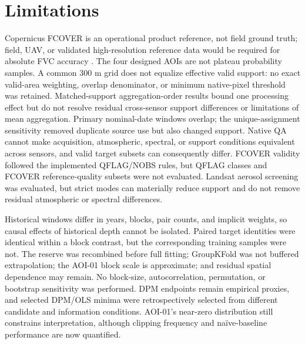 \section{Limitations}
Copernicus FCOVER is an operational product reference, not field ground truth; field, UAV, or validated high-resolution reference data would be required for absolute FVC accuracy \citep{baret2013,camacho2013,fuster2020,copernicus2025validation,mu2015sampling,chen2016uav,olofsson2014}. The four designed AOIs are not plateau probability samples. A common 300 m grid does not equalize effective valid support: no exact valid-area weighting, overlap denominator, or minimum native-pixel threshold was retained. Matched-support aggregation-order results bound one processing effect but do not resolve residual cross-sensor support differences or limitations of mean aggregation. Primary nominal-date windows overlap; the unique-assignment sensitivity removed duplicate source use but also changed support. Native QA cannot make acquisition, atmospheric, spectral, or support conditions equivalent across sensors, and valid target subsets can consequently differ. FCOVER validity followed the implemented QFLAG/NOBS rules, but QFLAG classes and FCOVER reference-quality subsets were not evaluated. Landsat aerosol screening was evaluated, but strict modes can materially reduce support and do not remove residual atmospheric or spectral differences.

Historical windows differ in years, blocks, pair counts, and implicit weights, so causal effects of historical depth cannot be isolated. Paired target identities were identical within a block contrast, but the corresponding training samples were not. The reserve was recombined before full fitting; GroupKFold was not buffered extrapolation; the AOI-01 block scale is approximate; and residual spatial dependence may remain. No block-size, autocorrelation, permutation, or bootstrap sensitivity was performed. DPM endpoints remain empirical proxies, and selected DPM/OLS minima were retrospectively selected from different candidate and information conditions. AOI-01's near-zero distribution still constrains interpretation, although clipping frequency and naïve-baseline performance are now quantified.

